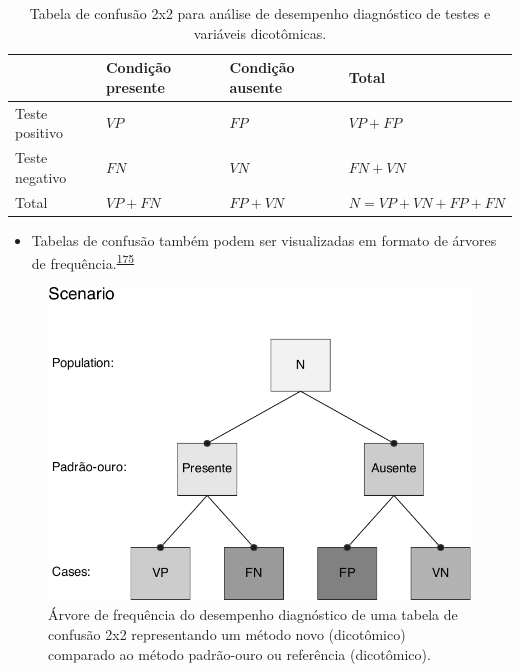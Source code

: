 \documentclass[
  a4paper,
]{book}
\providecommand{\tightlist}{%
  \setlength{\itemsep}{0pt}\setlength{\parskip}{0pt}}
\begin{document}
\begin{table}

\caption{\label{tab:crosstable}Tabela de confusão 2x2 para análise de desempenho diagnóstico de testes e variáveis dicotômicas.}
\centering
\begin{tabu} to 
\toprule
\textbf{ } & \textbf{Condição presente} & \textbf{Condição ausente} & \textbf{Total}\\
\midrule
Teste positivo & $VP$ & $FP$ & $VP+FP$\\
Teste negativo & $FN$ & $VN$ & $FN+VN$\\
Total & $VP+FN$ & $FP+VN$ & $N=VP+VN+FP+FN$\\
\bottomrule
\end{tabu}
\end{table}

\begin{itemize}
\tightlist
\item
  Tabelas de confusão também podem ser visualizadas em formato de árvores de frequência.\textsuperscript{\protect\hyperlink{ref-steckelberg2004}{175}}
\end{itemize}

\begin{figure}

{\centering \includegraphics{Ciencia-com-R_files/figure-latex/frequency-tree-1} 

}

\caption{Árvore de frequência do desempenho diagnóstico de uma tabela de confusão 2x2 representando um método novo (dicotômico) comparado ao método padrão-ouro ou referência (dicotômico).}\label{fig:frequency-tree}
\end{figure}
\end{document}
